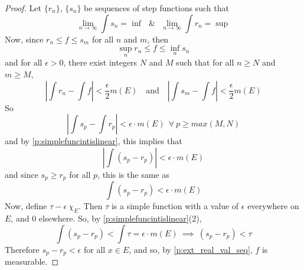 \begin{pblm}
\begin{proof}
	Let $\{r_n\}$, $\{s_n\}$ be sequences of step functions such that 
	\begin{equation*}
		\lim\limits_{n\to\infty} \int s_n = \inf ~~~ \& ~~~ 
		\lim\limits_{n\to\infty} \int r_n = \sup 
	\end{equation*}
	Now, since $r_n \le f \le s_m$ for all $n$ and $m$, then 
	\begin{equation*}
		\sup\limits_{n}r_n \le f \le \inf\limits_{n}s_n
	\end{equation*}
	and for all $\epsilon > 0$, there exist integers $N$ and $M$ such that for all 
	$n \ge N$ and $m \ge M$, 
	\begin{equation*}
		\left|\int r_n - \int f\right| < \frac{\epsilon}{2}m(E) ~~~ \text{ and } ~~~ 
		\left|\int s_m - \int f\right| < \frac{\epsilon}{2}m(E)
	\end{equation*}
	So 
	\begin{equation*}
		\left|\int s_p - \int r_p\right| < \epsilon \cdot m(E) ~~\forall~ p \ge max(M,N)
	\end{equation*}
	and by \ref{p:simplefuncintislinear}, this implies that 
	\begin{equation*}
		\left|\int (s_p - r_p)\right| < \epsilon \cdot m(E)
	\end{equation*}
	and since $s_p \ge r_p$ for all $p$, this is the same as 
	\begin{equation*}
		\int (s_p - r_p) < \epsilon \cdot m(E)
	\end{equation*}
	Now, define $\tau - \epsilon ~\chi_E$. Then $\tau$ is a simple function with a 
	value of $\epsilon$ everywhere on $E$, and $0$ elsewhere. So, by 
	 \ref{p:simplefuncintislinear}(2), 
	\begin{equation*}
		\int (s_p - r_p) < \int \tau =  \epsilon \cdot m(E) ~ \implies ~ (s_p - r_p) < \tau 
	\end{equation*}
	Therefore $s_p - r_p < \epsilon$ for all $x \in E$, and so, by \ref{p:ext_real_val_seq}, $f$ is measurable. 


\end{proof}
\end{pblm}

